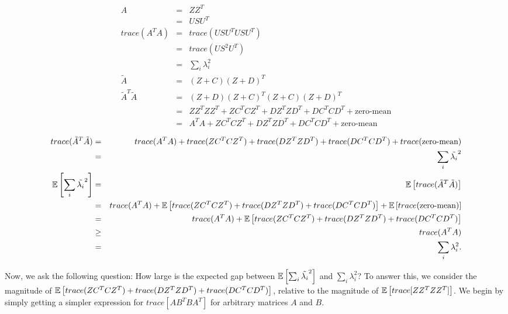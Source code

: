 \documentclass[12pt]{article}
\newcommand{\tA}{\tilde{A}}
\begin{document}
\begin{eqnarray*}
	A &=& ZZ^T \\
	&=& USU^T \\ %
	trace(A^T A) &=& trace( USU^T U S U^T)\\
	&=& trace( US^2 U^T) \\
	&=& \sum_i{\lambda_i^2}\\
	\tA &=& (Z+C)(Z+D)^T \\
	\tA^T\tA &=& (Z+D)(Z+C)^T(Z+C)(Z+D)^T \\
	&=& ZZ^TZZ^T + ZC^TCZ^T + DZ^TZD^T + DC^TCD^T + \text{zero-mean}\\ 
	&=& A^TA + ZC^TCZ^T + DZ^TZD^T + DC^TCD^T + \text{zero-mean}\\ 
\end{eqnarray*}
\begin{eqnarray*}
	trace(\tA^T\tA) &=& trace(A^TA) + trace(ZC^TCZ^T) + trace(DZ^TZD^T) + trace(DC^TCD^T) + trace(\text{zero-mean})\\ 
	&=& \sum_i \tilde{\lambda_i}^2\\
	\expect{}{\sum_i \tilde{\lambda_i}^2} &=& \expect{}{trace(\tA^T\tA)} \\
	&=& trace(A^TA) + \expect{}{trace(ZC^TCZ^T) + trace(DZ^TZD^T) + trace(DC^TCD^T)} + \expect{}{trace(\text{zero-mean})}\\
	&=& trace(A^TA) + \expect{}{trace(ZC^TCZ^T) + trace(DZ^TZD^T) + trace(DC^TCD^T)}\\	
	&\geq& trace(A^TA) \\
	&=&  \sum_i{\lambda_i^2}. \\
\end{eqnarray*}

Now, we ask the following question: How large is the expected gap between $\expect{}{\sum_i \tilde{\lambda_i}^2}$ and $\sum_i{\lambda_i^2}$? To answer this, we consider the magnitude of 
$\expect{}{trace(ZC^TCZ^T) + trace(DZ^TZD^T) + trace(DC^TCD^T)}$, relative to the magnitude of
$\expect{}{trace[ZZ^TZZ^T]}$.  We begin by simply getting a simpler expression for $trace[AB^TBA^T]$ for
arbitrary matrices $A$ and $B$.\\
\end{document}
